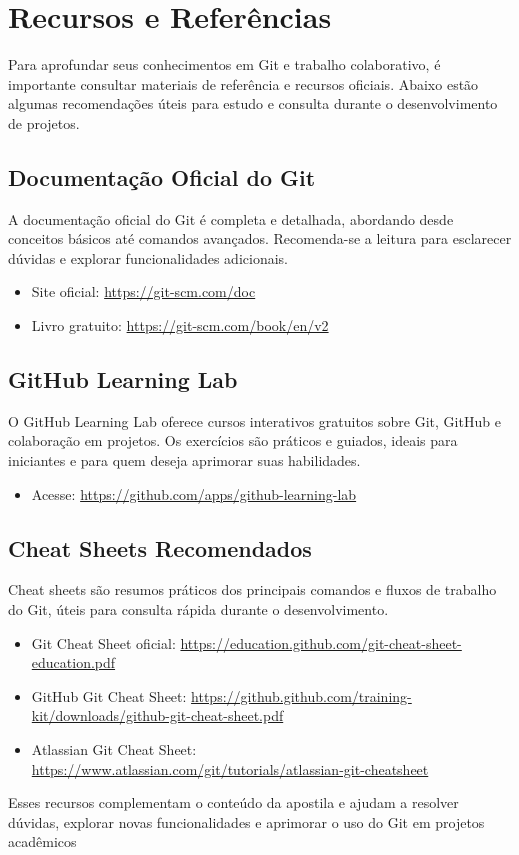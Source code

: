 \newpage
\section{Recursos e Referências}

Para aprofundar seus conhecimentos em Git e trabalho colaborativo, é importante consultar materiais de referência e recursos oficiais. Abaixo estão algumas recomendações úteis para estudo e consulta durante o desenvolvimento de projetos.

\subsection{Documentação Oficial do Git}

A documentação oficial do Git é completa e detalhada, abordando desde conceitos básicos até comandos avançados. Recomenda-se a leitura para esclarecer dúvidas e explorar funcionalidades adicionais.

\begin{itemize}
    \item Site oficial: \url{https://git-scm.com/doc}
    \item Livro gratuito: \url{https://git-scm.com/book/en/v2}
\end{itemize}

\subsection{GitHub Learning Lab}

O GitHub Learning Lab oferece cursos interativos gratuitos sobre Git, GitHub e colaboração em projetos. Os exercícios são práticos e guiados, ideais para iniciantes e para quem deseja aprimorar suas habilidades.

\begin{itemize}
    \item Acesse: \url{https://github.com/apps/github-learning-lab}
\end{itemize}

\subsection{Cheat Sheets Recomendados}

Cheat sheets são resumos práticos dos principais comandos e fluxos de trabalho do Git, úteis para consulta rápida durante o desenvolvimento.

\begin{itemize}
    \item Git Cheat Sheet oficial: \url{https://education.github.com/git-cheat-sheet-education.pdf}
    \item GitHub Git Cheat Sheet: \url{https://github.github.com/training-kit/downloads/github-git-cheat-sheet.pdf}
    \item Atlassian Git Cheat Sheet: \url{https://www.atlassian.com/git/tutorials/atlassian-git-cheatsheet}
\end{itemize}

Esses recursos complementam o conteúdo da apostila e ajudam a resolver dúvidas, explorar novas funcionalidades e aprimorar o uso do Git em projetos acadêmicos